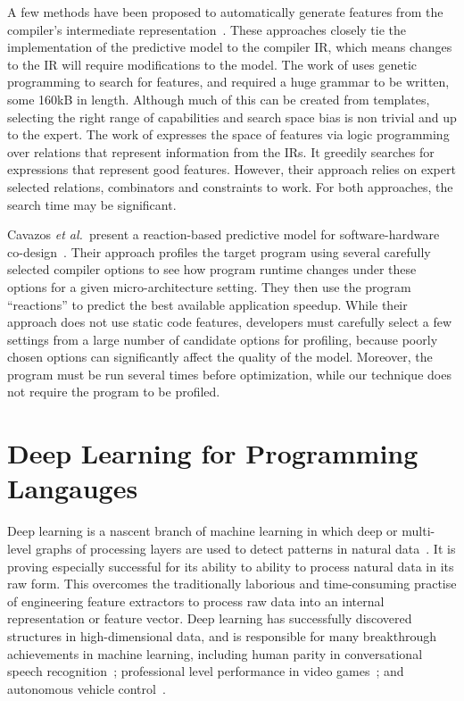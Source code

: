 A few methods have been proposed to automatically generate features from the compiler's intermediate representation~\cite{Namolaru2010a,Leather2014}. These approaches closely tie the implementation of the predictive model to the compiler IR, which means changes to the IR will require modifications to the model. The work of \cite{Leather2014} uses genetic programming to search for features, and required a huge grammar to be written, some 160kB in length. Although much of this can be created from templates, selecting the right range of capabilities and search space bias is non trivial and up to the expert. The work of \cite{Namolaru2010a} expresses the space of features via logic programming over relations that represent information from the IRs. It greedily searches for expressions that represent good features. However, their approach relies on expert selected relations, combinators and constraints to work. For both approaches, the search time may be significant.

Cavazos \emph{et al.\ }present a reaction-based predictive model for software-hardware co-design~\cite{Cavazos2006}. Their approach profiles the target program using several carefully selected compiler options to see how program runtime changes under these options for a given micro-architecture setting. They then use the program ``reactions'' to predict the best available application speedup. While their approach does not use static code features, developers must carefully select a few settings from a large number of candidate options for profiling, because poorly chosen options can significantly affect the quality of the model. Moreover, the program must be run several times before optimization, while our technique does not require the program to be profiled.

\section{Deep Learning for Programming Langauges}

Deep learning is a nascent branch of machine learning in which deep or multi-level graphs of processing layers are used to detect patterns in natural data~\cite{Buduma2015,LeCun2015}. It is proving especially successful for its ability to ability to process natural data in its raw form. This overcomes the traditionally laborious and time-consuming practise of engineering feature extractors to process raw data into an internal representation or feature vector. Deep learning has successfully discovered structures in high-dimensional data, and is responsible for many breakthrough achievements in machine learning, including human parity in conversational speech recognition~\cite{Xiong2016}; professional level performance in video games~\cite{Mnih2015}; and autonomous vehicle control~\cite{Lozano-Perez2012}.

